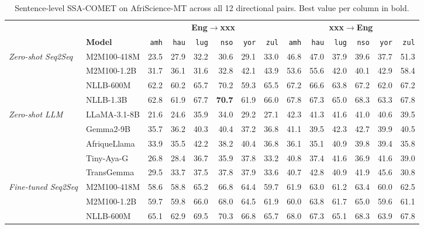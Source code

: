 \begin{table}[t!]
\centering
\footnotesize
\setlength{\tabcolsep}{4pt}
\renewcommand{\arraystretch}{1.05}
\caption{Sentence-level SSA-COMET on AfriScience-MT across all 12 directional pairs. Best value per column in bold.}
\label{tab:headline_ssa_comet}
\begin{tabular}{llrrrrrrrrrrrr}
\toprule
 & & \multicolumn{6}{c}{\textbf{Eng$\to$xxx}} & \multicolumn{6}{c}{\textbf{xxx$\to$Eng}} \\
\cmidrule(lr){3-8}\cmidrule(lr){9-14}
 & \textbf{Model} & \texttt{amh} & \texttt{hau} & \texttt{lug} & \texttt{nso} & \texttt{yor} & \texttt{zul} & \texttt{amh} & \texttt{hau} & \texttt{lug} & \texttt{nso} & \texttt{yor} & \texttt{zul} \\
\midrule
\multirow{4}{*}{\textit{Zero-shot Seq2Seq}} & M2M100-418M & 23.5 & 27.9 & 32.2 & 30.6 & 29.1 & 33.0 & 46.8 & 47.0 & 37.9 & 39.6 & 37.7 & 51.3 \\
 & M2M100-1.2B & 31.7 & 36.1 & 31.6 & 32.8 & 42.1 & 43.9 & 53.6 & 55.6 & 42.0 & 40.1 & 42.9 & 58.4 \\
 & NLLB-600M & 62.2 & 60.2 & 65.7 & 70.2 & 59.3 & 65.5 & 67.2 & 66.6 & 63.8 & 67.2 & 62.0 & 67.2 \\
 & NLLB-1.3B & 62.8 & 61.9 & 67.7 & \textbf{70.7} & 61.9 & 66.0 & 67.8 & 67.3 & 65.0 & 68.3 & 63.3 & 67.8 \\
\midrule
\multirow{5}{*}{\textit{Zero-shot LLM}} & LLaMA-3.1-8B & 21.6 & 24.6 & 35.9 & 34.0 & 29.2 & 27.1 & 42.3 & 41.3 & 41.6 & 41.0 & 40.6 & 39.5 \\
 & Gemma2-9B & 35.7 & 36.2 & 40.3 & 40.4 & 37.2 & 36.8 & 41.1 & 39.5 & 42.3 & 42.7 & 39.9 & 40.5 \\
 & AfriqueLlama & 33.9 & 35.5 & 42.2 & 38.2 & 40.4 & 36.8 & 36.1 & 35.1 & 40.9 & 39.8 & 39.4 & 35.8 \\
 & Tiny-Aya-G & 26.8 & 28.4 & 36.7 & 35.9 & 37.8 & 33.2 & 40.8 & 37.4 & 41.6 & 36.9 & 41.6 & 39.0 \\
 & TransGemma & 29.5 & 33.7 & 37.5 & 37.8 & 37.9 & 33.6 & 40.7 & 42.8 & 40.9 & 41.9 & 45.6 & 30.8 \\
\midrule
\multirow{4}{*}{\textit{Fine-tuned Seq2Seq}} & M2M100-418M & 58.6 & 58.8 & 65.2 & 66.8 & 64.4 & 59.7 & 61.9 & 63.0 & 61.2 & 63.4 & 60.0 & 62.5 \\
 & M2M100-1.2B & 59.7 & 59.8 & 66.0 & 68.0 & 64.5 & 61.9 & 60.0 & 63.8 & 61.7 & 65.0 & 59.6 & 61.1 \\
 & NLLB-600M & 65.1 & 62.9 & 69.5 & 70.3 & 66.8 & 65.7 & 68.0 & 67.3 & 65.1 & 68.3 & 63.9 & 67.8 \\

\end{tabular}
\end{table}
